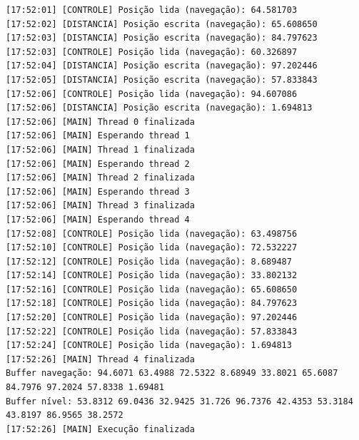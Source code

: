\documentclass[12pt]{article}
\begin{document}
\begin{verbatim}
[17:52:01] [CONTROLE] Posição lida (navegação): 64.581703
[17:52:02] [DISTANCIA] Posição escrita (navegação): 65.608650
[17:52:03] [DISTANCIA] Posição escrita (navegação): 84.797623
[17:52:03] [CONTROLE] Posição lida (navegação): 60.326897
[17:52:04] [DISTANCIA] Posição escrita (navegação): 97.202446
[17:52:05] [DISTANCIA] Posição escrita (navegação): 57.833843
[17:52:06] [CONTROLE] Posição lida (navegação): 94.607086
[17:52:06] [DISTANCIA] Posição escrita (navegação): 1.694813
[17:52:06] [MAIN] Thread 0 finalizada
[17:52:06] [MAIN] Esperando thread 1
[17:52:06] [MAIN] Thread 1 finalizada
[17:52:06] [MAIN] Esperando thread 2
[17:52:06] [MAIN] Thread 2 finalizada
[17:52:06] [MAIN] Esperando thread 3
[17:52:06] [MAIN] Thread 3 finalizada
[17:52:06] [MAIN] Esperando thread 4
[17:52:08] [CONTROLE] Posição lida (navegação): 63.498756
[17:52:10] [CONTROLE] Posição lida (navegação): 72.532227
[17:52:12] [CONTROLE] Posição lida (navegação): 8.689487
[17:52:14] [CONTROLE] Posição lida (navegação): 33.802132
[17:52:16] [CONTROLE] Posição lida (navegação): 65.608650
[17:52:18] [CONTROLE] Posição lida (navegação): 84.797623
[17:52:20] [CONTROLE] Posição lida (navegação): 97.202446
[17:52:22] [CONTROLE] Posição lida (navegação): 57.833843
[17:52:24] [CONTROLE] Posição lida (navegação): 1.694813
[17:52:26] [MAIN] Thread 4 finalizada
Buffer navegação: 94.6071 63.4988 72.5322 8.68949 33.8021 65.6087 84.7976 97.2024 57.8338 1.69481 
Buffer nível: 53.8312 69.0436 32.9425 31.726 96.7376 42.4353 53.3184 43.8197 86.9565 38.2572 
[17:52:26] [MAIN] Execução finalizada
\end{verbatim}
\end{document}
